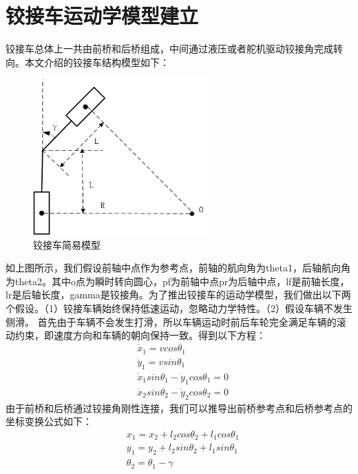 \documentclass[master,academic]{ysuthesis} %
\begin{document}
	\section{铰接车运动学模型建立}
	铰接车总体上一共由前桥和后桥组成，中间通过液压或者舵机驱动铰接角完成转向。本文介绍的铰接车结构模型如下：  
	\begin{figure}[!ht]
		\centering
		\includegraphics[width=0.6\textwidth]{铰接车简易模型.png}
		\caption{铰接车简易模型}
		\label{fig:铰接车简易模型}
	\end{figure}
	如上图所示，我们假设前轴中点作为参考点，前轴的航向角为theta1，后轴航向角为theta2。其中o点为瞬时转向圆心，pf为前轴中点pr为后轴中点，lf是前轴长度，lr是后轴长度，gamma是铰接角。为了推出铰接车的运动学模型，我们做出以下两个假设。（1）铰接车辆始终保持低速运动，忽略动力学特性。（2）假设车辆不发生侧滑。
	首先由于车辆不会发生打滑，所以车辆运动时前后车轮完全满足车辆的滚动约束，即速度方向和车辆的朝向保持一致。得到以下方程：
	\begin{equation}
		\begin{aligned}
			&\dot{x}_1=vcos\theta _1\\
			&\dot{y}_1=vsin\theta _1\\
			&\dot{x}_1sin\theta _1-\dot{y}_1cos\theta _1=0\\
			&\dot{x}_2sin\theta _2-\dot{y}_2cos\theta _2=0
		\end{aligned}
	\end{equation}
	由于前桥和后桥通过铰接角刚性连接，我们可以推导出前桥参考点和后桥参考点的坐标变换公式如下：
	\begin{equation}
		\begin{aligned}
			&x_1=x_2+l_2cos\theta _2+l_1cos\theta _1\\
			&y_1=y_2+l_2sin\theta _2+l_1sin\theta _1\\
			&\theta _2=\theta _1-\gamma 
		\end{aligned}
	\end{equation}
\end{document}
